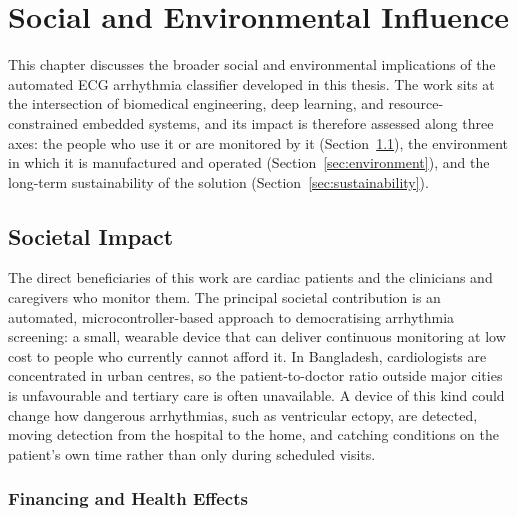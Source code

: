 %

\chapter{Social and Environmental Influence}
\label{ch:social}

This chapter discusses the broader social and environmental implications of
the automated ECG arrhythmia classifier developed in this thesis. The work
sits at the intersection of biomedical engineering, deep learning, and
resource-constrained embedded systems, and its impact is therefore assessed
along three axes: the people who use it or are monitored by it
(Section~\ref{sec:societal}), the environment in which it is manufactured
and operated (Section~\ref{sec:environment}), and the long-term
sustainability of the solution (Section~\ref{sec:sustainability}).

\section{Societal Impact}
\label{sec:societal}

The direct beneficiaries of this work are cardiac patients and the
clinicians and caregivers who monitor them. The principal societal
contribution is an automated, microcontroller-based approach to
democratising arrhythmia screening: a small, wearable device that can
deliver continuous monitoring at low cost to people who currently cannot
afford it. In Bangladesh, cardiologists are concentrated in urban centres,
so the patient-to-doctor ratio outside major cities is unfavourable and
tertiary care is often unavailable. A device of this kind could change how
dangerous arrhythmias, such as ventricular ectopy, are detected, moving
detection from the hospital to the home, and catching conditions on the
patient's own time rather than only during scheduled visits.

\subsection{Financing and Health Effects}
\label{subsec:financial_health}

